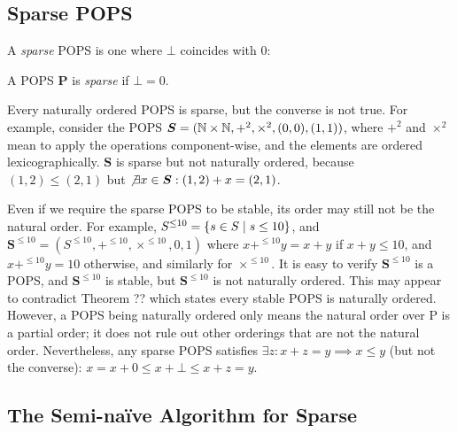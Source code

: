 \subsection{Sparse POPS}
\label{sec:sparse-pops}

A {\em sparse} POPS is one where $\bot$ coincides with $0$:
%
\begin{defn}
  \label{def:sparse}
  A POPS $\bm P$ is {\em sparse} if $\bot = 0$.
\end{defn}
%
Every naturally ordered POPS is sparse, but the converse is not true.
For example, 
 consider the POPS $\bm S = (\mathbb N \times \mathbb N, +^2, \times^2, (0, 0), (1, 1))$,
 where $+^2$ and $\times^2$ mean to apply the operations component-wise,
 and the elements are ordered lexicographically.
$\bm S$ is sparse but not naturally ordered, 
 because $(1, 2) \leq (2, 1)$ but
 $\not \exists x \in {\bm S} : (1, 2) + x = (2, 1)$.

Even if we require the sparse POPS to be stable, 
 its order may still not be the natural order.
For example, $S^{\leq 10} = \{{s \in S}\mid{ s \leq 10}\}$, 
 and ${\bm S}^{\leq 10} = (S^{\leq 10}, +^{\leq 10}, \times^{\leq 10}, 0, 1)$
 where $x +^{\leq 10} y = x + y$ if $x + y \leq 10$, and $x +^{\leq 10} y = 10$ otherwise, 
 and similarly for $\times^{\leq 10}$.
It is easy to verify ${\bm S}^{\leq 10}$ is a POPS, 
  and ${\bm S}^{\leq 10}$ is stable, 
  but ${\bm S}^{\leq 10}$ is not naturally ordered.
This may appear to contradict Theorem ?? which states
  every stable POPS is naturally ordered.
However, a POPS being naturally ordered only means 
 the natural order over P is a partial order;
 it does not rule out other orderings that are not the natural order.
Nevertheless, any sparse POPS satisfies 
 $\exists z : x + z = y \implies x \leq y$ (but not the converse):
$x = x + 0 \leq x + \bot \leq x + z = y$.

\subsection{The Semi-na\"ive Algorithm for Sparse \datalogo}
\label{sec:semi-naive-algorithm}

